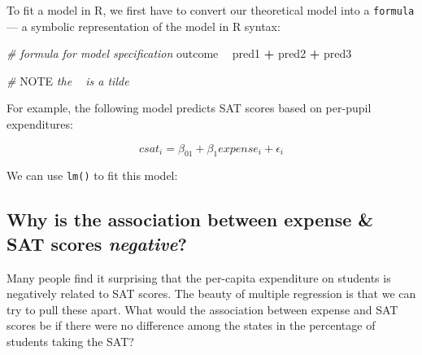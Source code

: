 \documentclass[
]{book}
\newenvironment{Shaded}{\begin{snugshade}}{\end{snugshade}}
\newcommand{\AlertTok}[1]{\textcolor[rgb]{0.94,0.16,0.16}{#1}}
\newcommand{\CommentTok}[1]{\textcolor[rgb]{0.56,0.35,0.01}{\textit{#1}}}
\newcommand{\DataTypeTok}[1]{\textcolor[rgb]{0.13,0.29,0.53}{#1}}
\newcommand{\DecValTok}[1]{\textcolor[rgb]{0.00,0.00,0.81}{#1}}
\newcommand{\KeywordTok}[1]{\textcolor[rgb]{0.13,0.29,0.53}{\textbf{#1}}}
\newcommand{\NormalTok}[1]{#1}
\newcommand{\OperatorTok}[1]{\textcolor[rgb]{0.81,0.36,0.00}{\textbf{#1}}}
\newcommand{\StringTok}[1]{\textcolor[rgb]{0.31,0.60,0.02}{#1}}
\begin{document}
To fit a model in R, we first have to convert our theoretical model into
a \texttt{formula} --- a symbolic representation of the model in R syntax:

\begin{Shaded}
\begin{Highlighting}[]
\CommentTok{# formula for model specification}
\NormalTok{outcome }\OperatorTok{~}\StringTok{ }\NormalTok{pred1 }\OperatorTok{+}\StringTok{ }\NormalTok{pred2 }\OperatorTok{+}\StringTok{ }\NormalTok{pred3}

\CommentTok{# }\AlertTok{NOTE}\CommentTok{ the ~ is a tilde}
\end{Highlighting}
\end{Shaded}

For example, the following model predicts SAT scores based on per-pupil expenditures:

\[
csat_i = \beta_01 + \beta_1expense_i + \epsilon_i
\]

We can use \texttt{lm()} to fit this model:

\begin{Shaded}
\end{Shaded}

\hypertarget{why-is-the-association-between-expense-sat-scores-negative}{%
\subsection{\texorpdfstring{Why is the association between expense \& SAT scores \emph{negative}?}{Why is the association between expense \& SAT scores negative?}}\label{why-is-the-association-between-expense-sat-scores-negative}}

Many people find it surprising that the per-capita expenditure on students is negatively related to SAT scores. The beauty of multiple regression is that we can try to pull these apart. What would the association between expense and SAT scores be if there were no difference among the states in the percentage of students taking the SAT?
\end{document}
